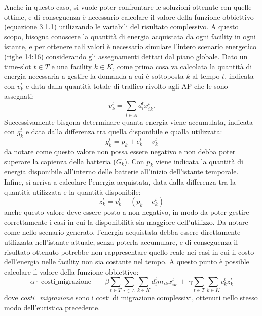 Anche in questo caso, si vuole poter confrontare le soluzioni ottenute con quelle ottime, e di conseguenza è necessario calcolare il valore della funzione obbiettivo (\hyperref[eq:dinamico-obj]{equazione 3.1.1}) utilizzando le variabili del risultato complessivo. A questo scopo, bisogna conoscere la quantità di energia acquistata da ogni facility in ogni istante, e per ottenere tali valori è necessario simulare l'intero scenario energetico (righe 14:16) considerando gli assegnamenti dettati dal piano globale. Dato un time-slot $t \in T$ e una facility $k \in K$, come prima cosa va calcolata la quantità di energia necessaria a gestire la domanda a cui è sottoposta $k$ al tempo $t$, indicata con $v^t_k$ e data dalla quantità totale di traffico rivolto agli AP che le sono assegnati:
\begin{equation}
    v^t_k = \sum_{i \in A} d^t_i x^t_{ik}.
\end{equation}
Successivamente bisgona determinare quanta energia viene accumulata, indicata con $g^t_k$ e data dalla differenza tra quella disponibile e qualla utilizzata:
\begin{equation}
    g^t_k = p_k + e^t_k- v^t_k
\end{equation}
da notare come questo valore non possa essere negativo e non debba poter superare la capienza della batteria ($G_k$). Con $p_k$ viene indicata la quantità di energia disponibile all'interno delle batterie all'inizio dell'istante temporale. Infine, si arriva a calcolare l'energia acquistata, data dalla differenza tra la quantità utilizzata e la quantità disponibile:
\begin{equation}
    z^t_k = v^t_k - \left(p_k + e^t_k\right)
\end{equation}
anche questo valore deve essere posto a non negativo, in modo da poter gestire correttamente i casi in cui la disponibilità sia maggiore dell'utilizzo. Da notare come nello scenario generato, l'energia acquistata debba essere direttamente utilizzata nell'istante attuale, senza poterla accumulare, e di conseguenza il risultato ottenuto potrebbe non rappresentare quello reale nei casi in cui il costo dell'energia nelle facility non sia costante nel tempo. A questo punto è possible calcolare il valore della funzione obbiettivo:
\begin{equation}
    \alpha \cdot \operatorname{costi\_migrazione} ~ + ~ \beta \sum_{t \in T}\sum_{i \in A}\sum_{k \in K} d^t_i m_{ik} x^t_{ik} ~ + ~ \gamma \sum_{t \in T} \sum_{k \in K} c^t_k z^t_k
\end{equation}
dove \textit{costi\_migrazione} sono i costi di migrazione complessivi, ottenuti nello stesso modo dell'euristica precedente.\\
